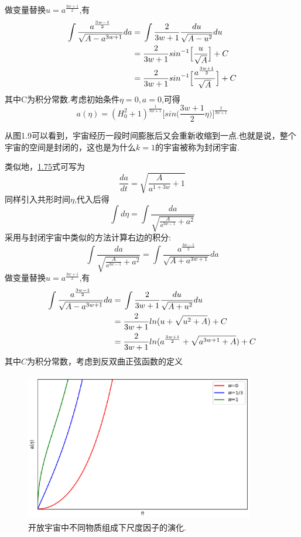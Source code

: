 \documentclass[a4paper]{book}
\begin{document}
做变量替换$u=a^{\frac{3w+1}{2}}$,有
\begin{align}
	\int\frac{	a^{\frac{3w-1}{2}}}{\sqrt{A-a^{3w+1}}}da={}&
	\int\frac{2}{3w+1}\frac{du}{\sqrt{A-u^2}}du\notag \\
	={}&\frac{2}{3w+1}sin^{-1}\Big[\frac{u}{\sqrt{A}}\Big]+C\notag \\
	={}&\frac{2}{3w+1}sin^{-1}\Big[\frac{a^{\frac{3w+1}{2}}}{\sqrt{A}}\Big]+C
\end{align}
其中C为积分常数.考虑初始条件$\eta=0,a=0$,可得
\begin{equation}
	a(\eta)=(H_0^2+1)^{\frac{1}{3w+1}}\Big[sin\Big(\frac{3w+1}{2}\eta\Big)\Big]^{\frac{2}{3w+1}}
\end{equation}

从图1.9可以看到，宇宙经历一段时间膨胀后又会重新收缩到一点.也就是说，整个宇宙的空间是封闭的，这也是为什么$k=1$的宇宙被称为封闭宇宙.\par
{}\par 
类似地，\hyperref[1.75]{1.75}式可写为
\begin{equation}\label{1.79}
	\frac{da}{dt}=\sqrt{\frac{A}{a^{1+3w}}+1}
\end{equation}
同样引入共形时间$\eta$,代入后得
\begin{equation}
		\int d\eta=\int\frac{da}{\sqrt{\frac{A}{a^{3w-1}}+a^2}}
\end{equation}
采用与封闭宇宙中类似的方法计算右边的积分:
\begin{equation}
	\int\frac{da}{\sqrt{\frac{A}{a^{3w-1}}+a^2}}=\int\frac{	a^{\frac{3w-1}{2}}}{\sqrt{A+a^{3w+1}}}da
\end{equation}
做变量替换$u=a^{\frac{3w+1}{2}}$,有
\begin{align}\label{1.91}
	\int\frac{	a^{\frac{3w-1}{2}}}{\sqrt{A-a^{3w+1}}}da={}&
	\int\frac{2}{3w+1}\frac{du}{\sqrt{A+u^2}}du\notag \\
	={}&\frac{2}{3w+1}ln(u+\sqrt{u^2+A})+C\notag \\
	={}&\frac{2}{3w+1}ln(a^{\frac{3w+1}{2}}+\sqrt{a^{3w+1}+A})+C
\end{align}
其中$C$为积分常数，考虑到反双曲正弦函数的定义
\begin{figure}[!h]
	\centering
	\includegraphics[width=10cm,height=6.5cm]{figures/k=-1.eps}
	\caption{开放宇宙中不同物质组成下尺度因子的演化.}
\end{figure}
\end{document}
